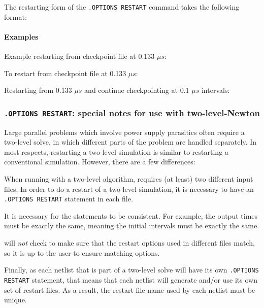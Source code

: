 The restarting form of the \texttt{.OPTIONS RESTART} command takes the following format:


\paragraph{Examples}

Example restarting from checkpoint file at 0.133 $\mu s$:

To restart from checkpoint file at 0.133 $\mu s$:

Restarting from 0.133 $\mu s$ and continue checkpointing at 0.1 $\mu s$
intervals:

\subsubsection{\texttt{.OPTIONS RESTART}: special notes for use with two-level-Newton}

Large parallel problems which involve power supply parasitics often
require a two-level solve, in which different parts of the problem
are handled separately.  In most respects, restarting a two-level
simulation is similar to restarting a conventional simulation.
However, there are a few differences:

\begin{XyceItemize}
\item When running with a two-level algorithm, \Xyce{} requires (at least) two
different input files.  In order to do a restart of a two-level \Xyce{}
simulation, it is necessary to have an \texttt{.OPTIONS RESTART} statement
in each file.

\item It is necessary for the statements to be consistent.  For example,
the output times must be exactly the same, meaning the initial intervals
must be exactly the same.

\item \Xyce{} will \emph{not} check to make sure that the restart
options used in different files match, so it is up to the user to ensure
matching options.

\item Finally, as each netlist that is part of a two-level solve will have its
own \texttt{.OPTIONS RESTART} statement, that means that each netlist
will generate and/or use its own set of restart files.  As a result,
the restart file name used by each netlist must be unique.
\end{XyceItemize}

